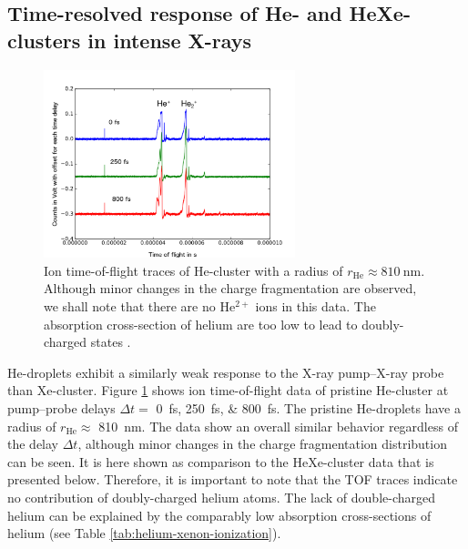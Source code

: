 \subsection[Time-resolved response of highly ionized He- and HeXe-clusters]{Time-resolved response of He- and HeXe-clusters in intense X-rays}\label{sec:hexe--and-he-TOF}
\begin{figure}
	\centering
		\includegraphics[width=0.65\textwidth]{images/results/TOF-helium-cluster.png}
	\caption[Time-resolved answer of He-clusters in TOF spectroscopy.]{Ion time-of-flight traces of He-cluster with a radius of $r_{\text{He}}\approx \SI{810}{\nano\meter}$. Although minor changes in the charge fragmentation are observed, we shall note that there are no He$^{2+}$ ions in this data. The absorption cross-section of helium are too low to lead to doubly-charged states \citep{Ho-2016-PC}.}
	\label{fig:TOF-helium-cluster}
\end{figure}
%
He-droplets exhibit a similarly weak response to the X-ray pump--X-ray probe than Xe-cluster. Figure \ref{fig:TOF-helium-cluster} shows ion time-of-flight data of pristine He-cluster at pump--probe delays $\Delta t=$ \SIlist{0;250;800}{\femto\second}. The pristine He-droplets have a radius of $r_{\text{He}}\approx$ \SI{810}{\nano\meter}. The data show an overall similar behavior regardless of the delay $\Delta t$, although minor changes in the charge fragmentation distribution can be seen. It is here shown as comparison to the HeXe-cluster data that is presented below. Therefore, it is important to note that the TOF traces indicate no contribution of doubly-charged helium atoms. The lack of double-charged helium can be explained by the comparably low absorption cross-sections of helium (see Table \ref{tab:helium-xenon-ionization}).\\[1\baselineskip]
